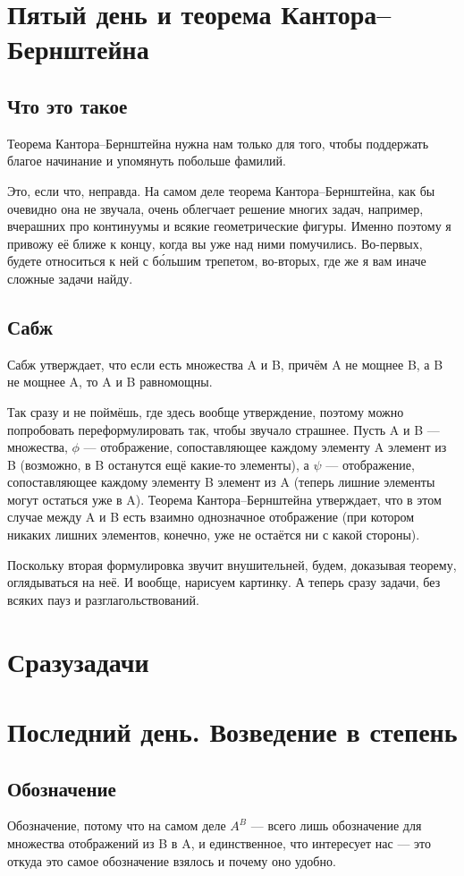 \documentclass[12pt, onecolumn]{report}
\begin{document}
\chapter{Пятый день и теорема Кантора--Бернштейна}
\section{Что это такое}
Теорема Кантора--Бернштейна нужна нам только для того, чтобы поддержать благое начинание и упомянуть побольше фамилий.

Это, если что, неправда. На самом деле теорема Кантора--Бернштейна, как бы очевидно она не звучала, очень облегчает решение многих задач, например, вчерашних про континуумы и всякие геометрические фигуры. Именно поэтому я привожу её ближе к концу, когда вы уже над ними помучились. Во-первых, будете относиться к ней с б\'{о}льшим трепетом, во-вторых, где же я вам иначе сложные задачи найду.
\section{Сабж}
Сабж утверждает, что если есть множества A и B, причём A не мощнее B, а B не мощнее A, то A и B равномощны.

Так сразу и не поймёшь, где здесь вообще утверждение, поэтому можно попробовать переформулировать так, чтобы звучало страшнее. Пусть A и B --- множества, $\phi$ --- отображение, сопоставляющее каждому элементу A элемент из B (возможно, в B останутся ещё какие-то элементы), а $\psi$ --- отображение, сопоставляющее каждому элементу B элемент из A (теперь лишние элементы могут остаться уже в A). Теорема Кантора--Бернштейна утверждает, что в этом случае между A и B есть взаимно однозначное отображение (при котором никаких лишних элементов, конечно, уже не остаётся ни с какой стороны).

Поскольку вторая формулировка звучит внушительней, будем, доказывая теорему, оглядываться на неё. И вообще, нарисуем картинку.
А теперь сразу задачи, без всяких пауз и разглагольствований.
\chapter*{Сразузадачи}
\chapter{Последний день. Возведение в степень}
\section{Обозначение}
Обозначение, потому что на самом деле $A^B$ --- всего лишь обозначение для множества отображений из B в A, и единственное, что интересует нас --- это откуда это самое обозначение взялось и почему оно удобно.
\end{document}

